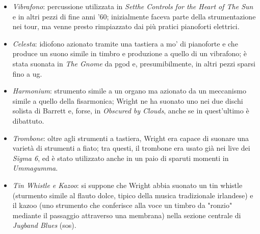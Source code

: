 \documentclass[class=book, crop=false, oneside, 12pt]{standalone}
\begin{document}
    \begin{itemize}
        \item \emph{Vibrafono}: percussione utilizzata in \emph{Setthe Controls for the Heart of The Sun} e in altri pezzi di fine anni '60; inizialmente faceva parte della strumentazione nei tour, ma venne presto rimpiazzato dai più pratici pianoforti elettrici.
        \item \emph{Celesta}: idiofono azionato tramite una tastiera a mo' di pianoforte e che produce un suono simile in timbro e produzione a quello di un vibrafono; è stata suonata in \emph{The Gnome} da \acrshort{pgod} e, presumibilmente, in altri pezzi sparsi fino a \acrshort{ug}.
        \item \emph{Harmonium}: strumento simile a un organo ma azionato da un meccanismo simile a quello della fisarmonica; Wright ne ha suonato uno nei due dischi solista di Barrett e, forse, in \emph{Obscured by Clouds}, anche se in quest'ultimo è dibattuto.
        \item \emph{Trombone}: oltre agli strumenti a tastiera, Wright era capace di suonare una varietà di strumenti a fiato; tra questi, il trombone era usato già nei live dei \emph{Sigma 6}, ed è stato utilizzato anche in un paio di sparuti momenti in \emph{Ummagumma}.
        \item \emph{Tin Whistle e Kazoo}: si suppone che Wright abbia suonato un tin whistle (sturmento simile al flauto dolce, tipico della musica tradizionale irlandese) e il kazoo (uno strumento che conferisce alla voce un timbro da "ronzio" mediante il passaggio attraverso una membrana) nella sezione centrale di \emph{Jugband Blues} (\acrshort{sos}).
    \end{itemize}

    
\end{document}
